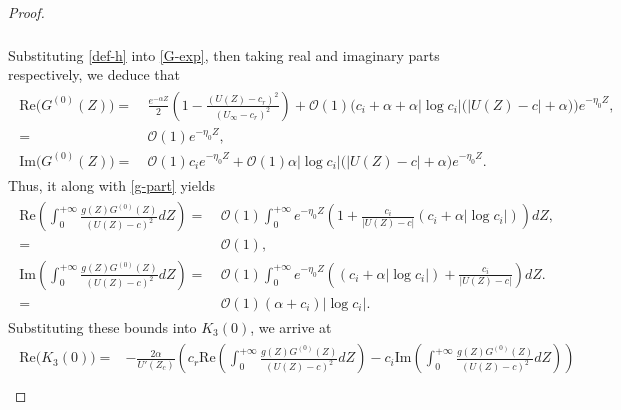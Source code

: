\documentclass[reqno,11pt]{amsart}
\numberwithin{equation}{section}
\numberwithin{equation}{section}
\theoremstyle{plain}
\begin{document}
\begin{proof}
\begin{align}
\begin{aligned}
			\end{aligned}\end{align}
	Substituting \eqref{def-h} into \eqref{G-exp}, then taking real and imaginary parts respectively, we deduce that
			\begin{align}\label{G-part}\begin{aligned}
					\text{Re}\big(G^{(0)}(Z)\big)=&~\frac{e^{-\alpha Z}}{2}\left(1-\frac{(U(Z)-c_r)^2}{(U_\infty-c_r)^2}\right) +\mathcal{O}(1)\Big(c_i+\alpha+\alpha|\log c_i|\big(|U(Z)-c|+\alpha\big)\Big)e^{-\eta_0Z},\\
					=&~\mathcal{O}(1)e^{-\eta_0Z},\\
					\text{Im}\big( G^{(0)}(Z)\big)=&~\mathcal{O}(1)c_ie^{-\eta_0Z}%
					+\mathcal{O}(1)\alpha|\log c_i|\big(|U(Z)-c|+\alpha\big)e^{-\eta_0 Z}.
			\end{aligned}\end{align}
			Thus, it along with \eqref{g-part} yields 
			\begin{align}\begin{aligned}
					\text{Re}\left(\int_{0}^{+\infty}\frac{g(Z)G^{(0)}(Z)}{(U(Z)-c)^2}dZ\right) =&~ \mathcal{O}(1)\int_{0}^{+\infty}e^{-\eta_0Z}\left(1+\frac{c_i}{|U(Z)-c|} \left(c_i+\alpha|\log c_i|\right)\right)dZ,\\
					=&~ \mathcal{O}(1),\\%
					\text{Im}\left(\int_{0}^{+\infty}\frac{g(Z)G^{(0)}(Z)}{(U(Z)-c)^2}dZ\right) =&~ \mathcal{O}(1)\int_{0}^{+\infty}e^{-\eta_0Z}\left(\left(c_i+\alpha|\log c_i|\right)+\frac{c_i}{|U(Z)-c|} \right)dZ.\\
					=&~ \mathcal{O}(1)(\alpha+c_i)|\log c_i|.\nonumber
			\end{aligned}\end{align}
	Substituting these bounds into $K_3(0)$, we arrive at
			\begin{align}\label{K3-0-im}\begin{aligned}
					\text{Re}\big(K_3(0)\big) =& -\frac{2\alpha}{U'(Z_c)}\left(c_r\text{Re}\left(\int_{0}^{+\infty}\frac{g(Z)G^{(0)}(Z)}{(U(Z)-c)^2}dZ\right) -c_i\text{Im}\left(\int_{0}^{+\infty}\frac{g(Z)G^{(0)}(Z)}{(U(Z)-c)^2}dZ\right) \right)\\

\end{aligned}
\end{align}
\end{proof}
\end{document}
